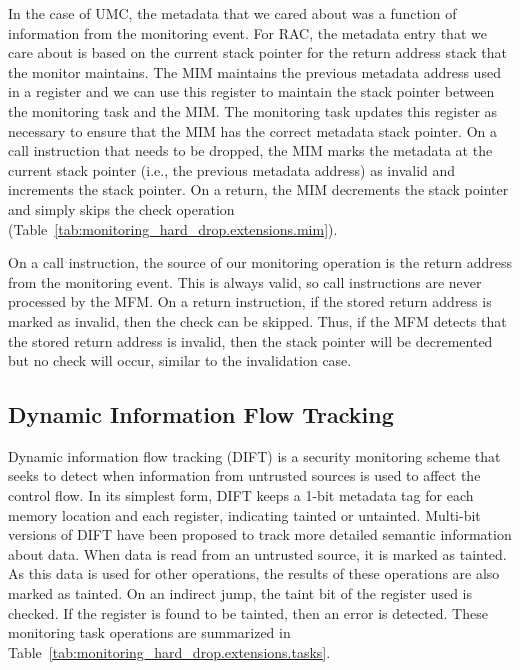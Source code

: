 In the case of UMC, the metadata that we cared about was a function of
information from the monitoring event. For RAC, the metadata entry that we care
about is based on the current stack pointer for the return address stack that
the monitor maintains.  The MIM maintains the previous metadata address used in
a register and we can use this register to maintain the stack pointer between
the monitoring task and the MIM. The monitoring task updates this register as
necessary to ensure that the MIM has the correct metadata stack pointer. On a
call instruction that needs to be dropped, the MIM marks the metadata at the
current stack pointer (i.e., the previous metadata address) as invalid and
increments the stack pointer. On a return, the MIM decrements the stack pointer
and simply skips the check operation
(Table~\ref{tab:monitoring_hard_drop.extensions.mim}).

On a call instruction, the source of our monitoring operation is the return
address from the monitoring event. This is always valid, so call instructions
are never processed by the MFM. On a return instruction, if the stored return
address is marked as invalid, then the check can be skipped. Thus, if the MFM
detects that the stored return address is invalid, then the stack pointer will
be decremented but no check will occur, similar to the invalidation case.

\subsection{Dynamic Information Flow Tracking}
\label{sec:monitoring_hard_drop.extensions.dift}

Dynamic information flow tracking (DIFT) \cite{suh-dift-asplos04} is a security
monitoring scheme that seeks to detect when information from untrusted sources
is used to affect the control flow.  In its simplest form, DIFT keeps a 1-bit
metadata tag for each memory location and each register, indicating tainted or
untainted. Multi-bit versions of DIFT have been proposed to track more detailed
semantic information about data. When data is read from an untrusted source, it
is marked as tainted. As this data is used for other operations, the results of
these operations are also marked as tainted. On an indirect jump, the taint bit
of the register used is checked. If the register is found to be tainted, then
an error is detected. These monitoring task operations are summarized in
Table~\ref{tab:monitoring_hard_drop.extensions.tasks}.

